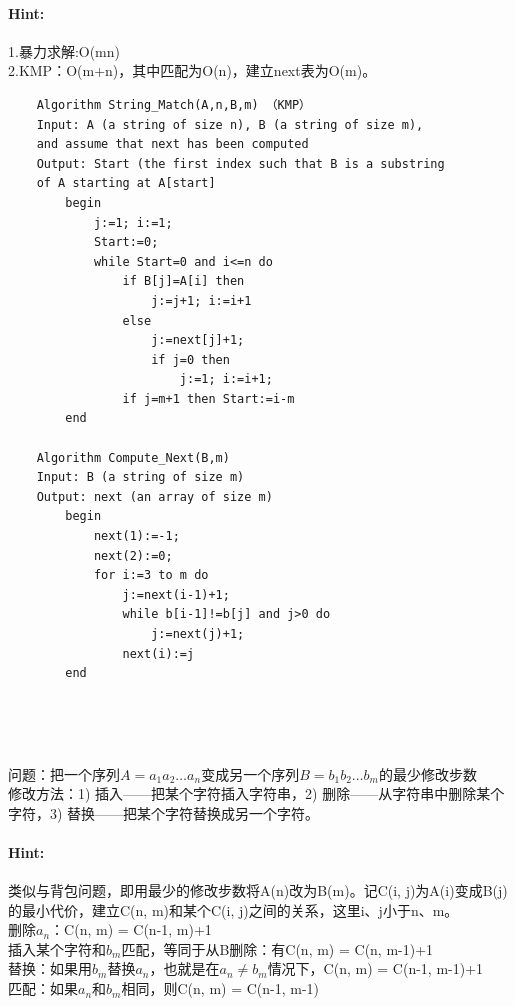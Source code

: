 \documentclass{article}
\begin{document}
     \paragraph{Hint:}1.暴力求解:O(mn)\\
    2.KMP：O(m+n)，其中匹配为O(n)，建立next表为O(m)。
    \lstset{language=C}
    \begin{lstlisting}
    Algorithm String_Match(A,n,B,m) （KMP）
    Input: A (a string of size n), B (a string of size m), 
    and assume that next has been computed
    Output: Start (the first index such that B is a substring 
    of A starting at A[start]
        begin
            j:=1; i:=1;
            Start:=0;
            while Start=0 and i<=n do
                if B[j]=A[i] then
                    j:=j+1; i:=i+1
                else
                    j:=next[j]+1;
                    if j=0 then
                        j:=1; i:=i+1;
                if j=m+1 then Start:=i-m
        end
        
    Algorithm Compute_Next(B,m)
    Input: B (a string of size m)
    Output: next (an array of size m)
        begin
            next(1):=-1;
            next(2):=0;
            for i:=3 to m do
                j:=next(i-1)+1;
                while b[i-1]!=b[j] and j>0 do
                    j:=next(j)+1;
                next(i):=j
        end

        
        
\end{lstlisting}
     \subsubsection{}问题：把一个序列$A=a_{1}a_2…a_n$变成另一个序列$B=b_1b_2…b_m$的最少修改步数\\
     修改方法：1) 插入——把某个字符插入字符串，2) 删除——从字符串中删除某个字符，3) 替换——把某个字符替换成另一个字符。
     
     \paragraph{Hint:}类似与背包问题，即用最少的修改步数将A(n)改为B(m)。记C(i, j)为A(i)变成B(j)的最小代价，建立C(n, m)和某个C(i, j)之间的关系，这里i、j小于n、m。\\
      删除$a_n$：C(n, m) = C(n-1, m)+1\\
      插入某个字符和$b_m$匹配，等同于从B删除：有C(n, m) = C(n, m-1)+1\\
      替换：如果用$b_m$替换$a_n$，也就是在$a_n \ne b_m$情况下，C(n, m) = C(n-1, m-1)+1\\
    匹配：如果$a_n$和$b_m$相同，则C(n, m) = C(n-1, m-1)\\
    
\end{document}
